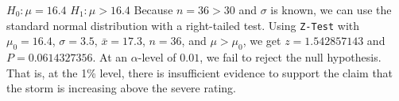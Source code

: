 \documentclass{article}
\newcommand{\answer}[1]{\color{white}#1}
\begin{document}
\begin{enumerate}
{\answer $H_0: \mu = 16.4$  
$H_1: \mu > 16.4$  
Because $n=36 > 30$ and $\sigma$ is known, we can use the standard normal distribution with a right-tailed test.  
Using \texttt{Z-Test} with $\mu_0 = 16.4$, $\sigma = 3.5$, $\bar{x} = 17.3$, $n=36$, and $\mu > \mu_0$, we get $z = 1.542857143$ and $P = 0.0614327356$.  
At an $\alpha$-level of $0.01$, we fail to reject the null hypothesis.  That is, at the 1\% level, there is insufficient evidence to support the claim that the storm is increasing above the severe rating. }  

\end{enumerate}

\vfill
\end{document}
